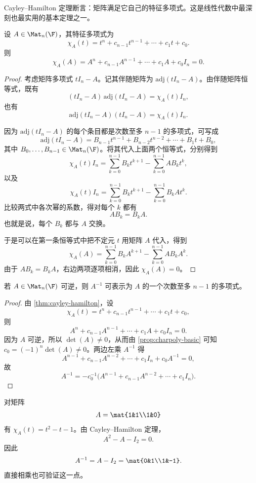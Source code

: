 Cayley--Hamilton 定理断言：矩阵满足它自己的特征多项式。这是线性代数中最深刻也最实用的基本定理之一。

\begin{theorem}\label{thm:cayley-hamilton}
设 \(A\in \Mat_n(\F)\)，其特征多项式为
\[
\chi_A(t)=t^n+c_{n-1}t^{n-1}+\cdots+c_1t+c_0.
\]
则
\[
\chi_A(A)=A^n+c_{n-1}A^{n-1}+\cdots+c_1A+c_0I_n=0.
\]
\end{theorem}

\begin{proof}
考虑矩阵多项式 \(tI_n-A\)。记其伴随矩阵为 \(\mathrm{adj}(tI_n-A)\)。由伴随矩阵恒等式，既有
\[
(tI_n-A)\,\mathrm{adj}(tI_n-A)=\chi_A(t)I_n,
\]
也有
\[
\mathrm{adj}(tI_n-A)(tI_n-A)=\chi_A(t)I_n.
\]

因为 \(\mathrm{adj}(tI_n-A)\) 的每个条目都是次数至多 \(n-1\) 的多项式，可写成
\[
\mathrm{adj}(tI_n-A)=B_{n-1}t^{n-1}+B_{n-2}t^{n-2}+\cdots+B_1t+B_0,
\]
其中 \(B_0,\dots,B_{n-1}\in \Mat_n(\F)\)。将其代入上面两个恒等式，分别得到
\[
\chi_A(t)I_n=\sum_{k=0}^{n-1} B_k t^{k+1}-\sum_{k=0}^{n-1}AB_k t^k,
\]
以及
\[
\chi_A(t)I_n=\sum_{k=0}^{n-1} B_k t^{k+1}-\sum_{k=0}^{n-1}B_kA t^k.
\]
比较两式中各次幂的系数，得对每个 \(k\) 都有
\[
AB_k=B_kA.
\]
也就是说，每个 \(B_k\) 都与 \(A\) 交换。

于是可以在第一条恒等式中把不定元 \(t\) 用矩阵 \(A\) 代入，得到
\[
\chi_A(A)=\sum_{k=0}^{n-1} B_k A^{k+1}-\sum_{k=0}^{n-1}AB_kA^k.
\]
由于 \(AB_k=B_kA\)，右边两项逐项相消，因此 \(\chi_A(A)=0\)。
\end{proof}

\begin{corollary}\label{cor:invertible-via-CH}
若 \(A\in \Mat_n(\F)\) 可逆，则 \(A^{-1}\) 可表示为 \(A\) 的一个次数至多 \(n-1\) 的多项式。
\end{corollary}

\begin{proof}
由 \cref{thm:cayley-hamilton}，设
\[
\chi_A(t)=t^n+c_{n-1}t^{n-1}+\cdots+c_1t+c_0,
\]
则
\[
A^n+c_{n-1}A^{n-1}+\cdots+c_1A+c_0I_n=0.
\]
因为 \(A\) 可逆，所以 \(\det(A)\neq 0\)，从而由 \cref{prop:charpoly-basic} 可知 \(c_0=(-1)^n\det(A)\neq 0\)。两边左乘 \(A^{-1}\) 得
\[
A^{n-1}+c_{n-1}A^{n-2}+\cdots+c_1I_n+c_0A^{-1}=0,
\]
故
\[
A^{-1}=-c_0^{-1}\bigl(A^{n-1}+c_{n-1}A^{n-2}+\cdots+c_1I_n\bigr).
\]
\end{proof}

\begin{example}
对矩阵
\[
A=\mat{1&1\\1&0}
\]
有 \(\chi_A(t)=t^2-t-1\)。由 Cayley--Hamilton 定理，
\[
A^2-A-I_2=0.
\]
因此
\[
A^{-1}=A-I_2=\mat{0&1\\1&-1}.
\]
直接相乘也可验证这一点。
\end{example}

